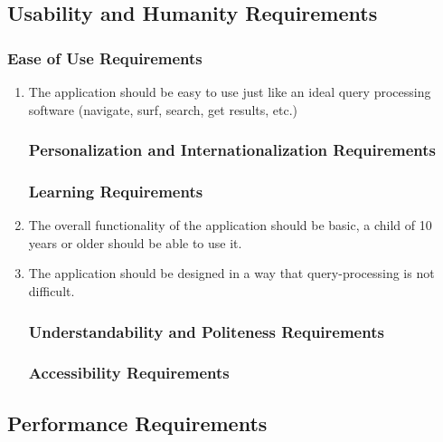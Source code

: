 \documentclass[]{article}
\begin{document}
\subsection{Usability and Humanity Requirements}
\label{sub:usability_and_humanity_requirements}

\subsubsection{Ease of Use Requirements}
\label{ssub:ease_of_use_requirements}
\begin{enumerate}[{UH}1. ]
	\item The application should be easy to use just like an ideal query processing software (navigate, surf, search, get results, etc.)

\subsubsection{Personalization and Internationalization Requirements}
\label{ssub:personalization_and_internationalization_requirements}


\subsubsection{Learning Requirements}
\label{ssub:learning_requirements}
	\item The overall functionality of the application should be basic, a child of 10 years or older should be able to use it.
	\item The application should be designed in a way that query-processing is not difficult.

\subsubsection{Understandability and Politeness Requirements}
\label{ssub:understandability_and_politeness_requirements}


\subsubsection{Accessibility Requirements}
\label{ssub:accessibility_requirements}
\end{enumerate}


\subsection{Performance Requirements}
\label{sub:performance_requirements}
\end{document}
